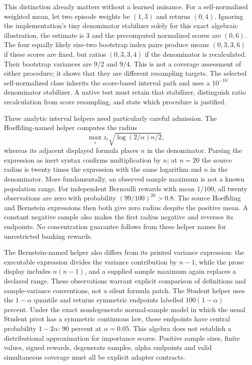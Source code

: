 This distinction already matters without a learned nuisance. For a
self-normalized weighted mean, let two episode weights be $(1,3)$ and returns
$(0,4)$. Ignoring the implementation's tiny denominator stabilizer solely for
this exact algebraic illustration, the estimate is $3$ and the precomputed
normalized scores are $(0,6)$. The four equally likely size-two bootstrap index
pairs produce means $(0,3,3,6)$ if these scores are fixed, but ratios
$(0,3,3,4)$ if the denominator is recalculated. Their bootstrap variances are
$9/2$ and $9/4$. This is not a coverage assessment of either procedure; it shows
that they are different resampling targets. The selected self-normalized class
inherits the score-based interval path and uses a $10^{-10}$ denominator
stabilizer. A native test must retain that stabilizer, distinguish ratio
recalculation from score resampling, and state which procedure is justified.
\cite{exec23_scope_rl_sources,exec23_scope_rl_reference}

Three analytic interval helpers need particularly careful admission. The
Hoeffding-named helper computes the radius
\[
 \max_i z_i\sqrt{\log(2/\alpha)n/2},
\]
whereas its adjacent displayed formula places $n$ in the denominator. Parsing
the expression as inert syntax confirms multiplication by $n$; at $n=20$ the
source radius is twenty times the expression with the same logarithm and $n$
in the denominator. More fundamentally, an observed sample maximum is not a
known population range. For independent Bernoulli rewards with mean $1/100$,
all twenty observations are zero with probability $(99/100)^{20}>0.8$. The
source Hoeffding and Bernstein expressions then both give zero radius despite
the positive mean. A constant negative sample also makes the first radius
negative and reverses its endpoints. No concentration guarantee follows from
these helper names for unrestricted banking rewards.
\cite{exec23_scope_rl_sources,exec23_scope_rl_reference}

The Bernstein-named helper also differs from its printed variance expression:
the executable expression divides the variance contribution by $n-1$, while
the prose display includes $n(n-1)$, and a supplied sample maximum again replaces
a declared range. These observations warrant explicit comparison of definitions
and sample-variance conventions, not a silent formula patch. The Student helper
uses the $1-\alpha$ quantile and returns symmetric endpoints labelled
$100(1-\alpha)$ percent. Under the exact nondegenerate normal-sample model in
which the usual Student pivot has a symmetric continuous law, those endpoints
have central probability $1-2\alpha$: $90$ percent at $\alpha=0.05$. This
algebra does not establish a distributional approximation for importance
scores. Positive sample sizes, finite values, signed rewards, degenerate
samples, alpha endpoints and valid simultaneous coverage must all be explicit
adapter contracts. \cite{exec23_scope_rl_sources,exec23_scope_rl_reference}

